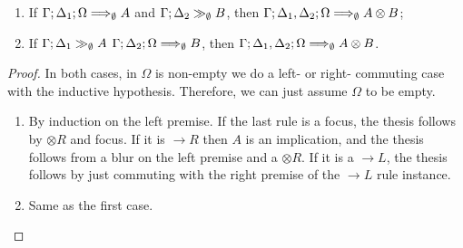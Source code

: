 \begin{lemma}\label{otimeslemma}\mbox{}
  \begin{enumerate}
  \item If $\Gamma; \Delta_1; \Omega \Longrightarrow_{\emptyset} A$ and
    $\Gamma; \Delta_2 \gg_{\emptyset} B$, then
    $\Gamma; \Delta_1, \Delta_2; \Omega \Longrightarrow_{\emptyset} A \otimes B$;
  \item If $\Gamma; \Delta_1 \gg_{\emptyset} A$
    $\Gamma; \Delta_2; \Omega \Longrightarrow_{\emptyset} B$, then
    $\Gamma; \Delta_1, \Delta_2; \Omega \Longrightarrow_{\emptyset} A \otimes B$.
  \end{enumerate}
\end{lemma}
\begin{proof}
  In both cases, in $\Omega$ is non-empty we do a left- or right- commuting case
  with the inductive hypothesis. Therefore, we can just assume $\Omega$ to be
  empty.

  \begin{enumerate}
  \item

    By induction on the left premise. If the last rule is a focus, the thesis
    follows by $\otimes R$ and focus. If it is $\rightarrow R$ then $A$ is an
    implication, and the thesis follows from a blur on the left premise and a
    $\otimes R$. If it is a $\rightarrow L$, the thesis follows by just
    commuting with the right premise of the $\rightarrow L$ rule instance.

  \item Same as the first case.

  \end{enumerate}
\end{proof}

